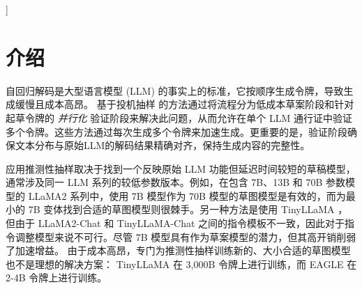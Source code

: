 \documentclass{article}
\theoremstyle{plain}
\theoremstyle{definition}
\theoremstyle{remark}
\begin{document}
\vskip 0.3in
]





\begin{abstract}
自回归解码使得大型语言模型 (LLM) 的推理非常耗时。在本文中，我们重新考虑推测性抽样并得出两个关键观察结果。首先，特征（第二层到顶层）级别的自回归比令牌级别更直接。其次，特征（第二层到顶层）级别的自回归固有的不确定性限制了其性能。基于这些见解，我们引入了 EAGLE（提高语言模型效率的外推算法），这是一个简单但高效的推测采样框架。通过合并一个时间步长的令牌序列，EAGLE 有效地解决了不确定性，以最小的开销实现精确的第二层到顶层特征预测。我们对 EAGLE 进行了全面评估，包括 Vicuna 和 LLaMA2-Chat 系列的所有模型、MoE 模型 Mixtral 8x7B Instruct 以及对话、代码生成、数学推理和指令跟踪等任务。对于 LLaMA2-Chat 70B，EAGLE 实现了\textbf{2.7倍-3.5倍}的延迟加速比，吞吐量加倍，同时保持了生成文本的分布。
\end{abstract}



\section{介绍}



自回归解码是大型语言模型 (LLM) 的事实上的标准，它按顺序生成令牌，导致生成缓慢且成本高昂。 
基于投机抽样 \cite{leviathan2023fast,chen2023accelerating} 的方法通过将流程分为低成本草案阶段和针对起草令牌的 \emph{并行化} 验证阶段来解决此问题，从而允许在单个 LLM 通行证中验证多个令牌。这些方法通过每次生成多个令牌来加速生成。更重要的是，验证阶段确保文本分布与原始LLM的解码结果精确对齐，保持生成内容的完整性。

应用推测性抽样取决于找到一个反映原始 LLM 功能但延迟时间较短的草稿模型，通常涉及同一 LLM 系列的较低参数版本。例如，在包含 7B、13B 和 70B 参数模型的 LLaMA2 \cite{touvron2023llama} 系列中，使用 7B 模型作为 70B 模型的草图模型是有效的，而为最小的 7B 变体找到合适的草图模型则很棘手。另一种方法是使用 TinyLLaMA \cite{zhang2024tinyllama}，但由于 LLaMA2-Chat 和 TinyLLaMA-Chat 之间的指令模板不一致，因此对于指令调整模型来说不可行。尽管 7B 模型具有作为草案模型的潜力，但其高开销削弱了加速增益。
由于成本高昂，专门为推测性抽样训练新的、大小合适的草图模型也不是理想的解决方案： 
TinyLLaMA 在 3,000B 令牌上进行训练，而 EAGLE 在 2-4B 令牌上进行训练。
\end{document}
